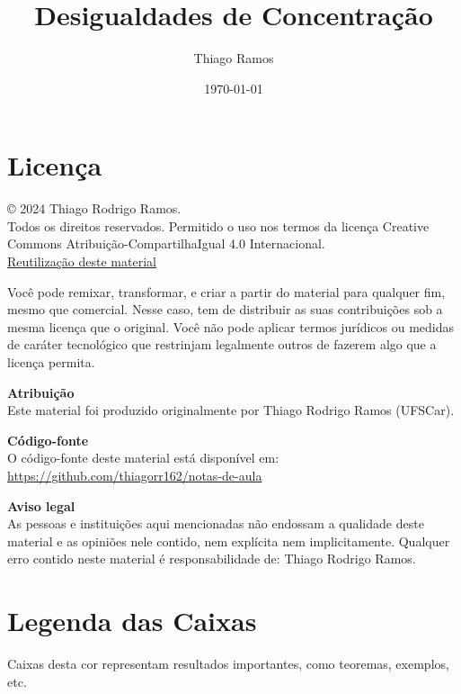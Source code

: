 \documentclass[12pt,a4paper,oneside]{book}
\theoremstyle{definition}
\theoremstyle{remark}
\numberwithin{equation}{section}
\begin{document}
\title{{\Huge Desigualdades de Concentração}}

\author{Thiago Ramos}

\maketitle


\section*{Licença}

© 2024 Thiago Rodrigo Ramos. \\
Todos os direitos reservados. Permitido o uso nos termos da licença Creative Commons Atribuição-CompartilhaIgual 4.0 Internacional. \\
\href{https://creativecommons.org/licenses/by-sa/4.0/}{Reutilização deste material}

Você pode remixar, transformar, e criar a partir do material para qualquer fim, mesmo que comercial. Nesse caso, tem de distribuir as suas contribuições sob a mesma licença que o original. Você não pode aplicar termos jurídicos ou medidas de caráter tecnológico que restrinjam legalmente outros de fazerem algo que a licença permita.


\noindent\textbf{Atribuição} \\
Este material foi produzido originalmente por Thiago Rodrigo Ramos (UFSCar).


\noindent\textbf{Código-fonte} \\
O código-fonte deste material está disponível em:
\url{https://github.com/thiagorr162/notas-de-aula}


\noindent\textbf{Aviso legal} \\
As pessoas e instituições aqui mencionadas não endossam a qualidade deste material e as opiniões nele contido, nem explícita nem implicitamente. Qualquer erro contido neste material é responsabilidade de: Thiago Rodrigo Ramos.

\vspace{5em}
\date{\today}



\tableofcontents
\newpage 


\section*{Legenda das Caixas}


\begin{tcolorbox}
Caixas desta cor representam resultados importantes, como teoremas, exemplos, etc.
\end{tcolorbox}
\end{document}
